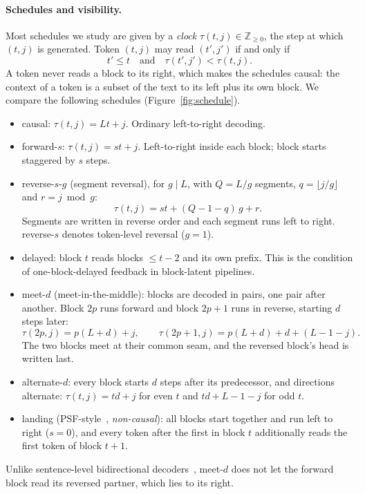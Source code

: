 \documentclass[11pt]{article}
\theoremstyle{definition}
\theoremstyle{remark}
\newcommand{\sch}[1]{\textsf{#1}}
\begin{document}
\paragraph{Schedules and visibility.}
Most schedules we study are given by a \emph{clock} $\tau(t,j)\in\mathbb{Z}_{\ge 0}$, the step at which $(t,j)$ is generated.
Token $(t,j)$ may read $(t',j')$ if and only if
\begin{equation}
  t'\le t \quad\text{and}\quad \tau(t',j')<\tau(t,j).
  \label{eq:visibility}
\end{equation}
A token never reads a block to its right, which makes the schedules causal: the context of a token is a subset of the text to its left plus its own block.
We compare the following schedules (Figure~\ref{fig:schedule}).
\begin{itemize}
  \item \sch{causal}: $\tau(t,j)=Lt+j$. Ordinary left-to-right decoding.
  \item \sch{forward-$s$}: $\tau(t,j)=st+j$. Left-to-right inside each block; block starts staggered by $s$ steps.
  \item \sch{reverse-$s$-$g$} (segment reversal), for $g\mid L$, with $Q=L/g$ segments, $q=\lfloor j/g\rfloor$ and $r=j\bmod g$:
  \begin{equation}
    \tau(t,j)=st+(Q-1-q)\,g+r .
    \label{eq:clock}
  \end{equation}
  Segments are written in reverse order and each segment runs left to right. \sch{reverse-$s$} denotes token-level reversal ($g=1$).
  \item \sch{delayed}: block $t$ reads blocks $\le t-2$ and its own prefix. This is the condition of one-block-delayed feedback in block-latent pipelines.
  \item \sch{meet-$d$} (meet-in-the-middle): blocks are decoded in pairs, one pair after another. Block $2p$ runs forward and block $2p+1$ runs in reverse, starting $d$ steps later:
  \begin{equation}
    \tau(2p,j)=p(L+d)+j,\qquad \tau(2p+1,j)=p(L+d)+d+(L-1-j).
    \label{eq:meet}
  \end{equation}
  The two blocks meet at their common seam, and the reversed block's head is written last.
  \item \sch{alternate-$d$}: every block starts $d$ steps after its predecessor, and directions alternate: $\tau(t,j)=td+j$ for even $t$ and $td+L-1-j$ for odd $t$.
  \item \sch{landing} (PSF-style~\citep{he2026psf}, \emph{non-causal}): all blocks start together and run left to right ($s=0$), and every token after the first in block $t$ additionally reads the first token of block $t+1$.
\end{itemize}
Unlike sentence-level bidirectional decoders~\citep{zhou2019sbnmt,zhang2020interleaved}, \sch{meet-$d$} does not let the forward block read its reversed partner, which lies to its right.
\end{document}
